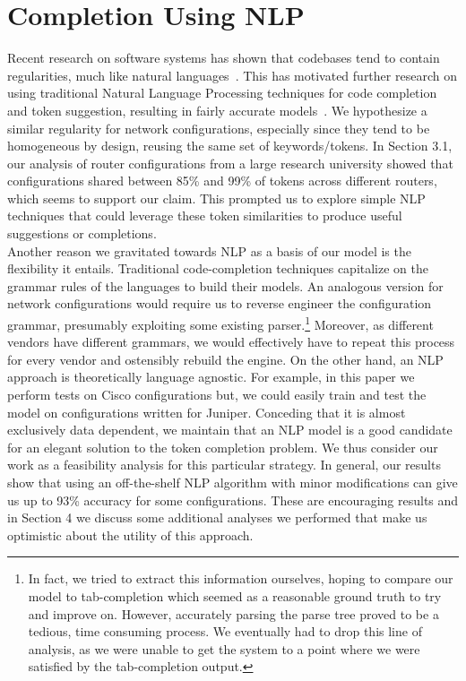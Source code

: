 \documentclass[../thesis.tex]{subfiles}
\begin{document}
\section{Completion Using NLP}
Recent research on software systems has shown that codebases tend to contain regularities, much like natural languages~\cite{naturalness}. This has motivated further research on using traditional Natural Language Processing techniques for code completion and token suggestion, resulting in fairly accurate models~\cite{naturalness, raychev}. We hypothesize a similar regularity for network configurations, especially since they tend to be homogeneous by design, reusing the same set of keywords/tokens. In Section 3.1, our analysis of router configurations from a large research university showed that configurations shared between 85\% and 99\% of tokens across different routers, which seems to support our claim. This prompted us to explore simple NLP techniques that could leverage these token similarities to produce useful suggestions or completions.\\

Another reason we gravitated towards NLP as a basis of our model is the flexibility it entails. Traditional code-completion techniques capitalize on the grammar rules of the languages to build their models. An analogous version for network configurations would require us to reverse engineer the configuration grammar, presumably exploiting some existing parser.\footnote{In fact, we tried to extract this information ourselves, hoping to compare our model to tab-completion which seemed as a reasonable ground truth to try and improve on. However, accurately parsing the parse tree proved to be a tedious, time consuming process. We eventually had to drop this line of analysis, as we were unable to get the system to a point where we were satisfied by the tab-completion output.}
Moreover, as different vendors have different grammars, we would effectively have to repeat this process for every vendor and ostensibly rebuild the engine. On the other hand, an NLP approach is theoretically language agnostic. For example, in this paper we perform tests on Cisco configurations but, we could easily train and test the model on configurations written for Juniper. Conceding that it is almost exclusively data dependent, we maintain that an NLP model is a good candidate for an elegant solution to the token completion problem. We thus consider our work as a feasibility analysis for this particular strategy. In general, our results show that using an off-the-shelf NLP algorithm with minor modifications can give us up to 93\% accuracy for some configurations. These are encouraging results and in Section 4 we discuss some additional analyses we performed that make us optimistic about the utility of this approach.\\
\end{document}
